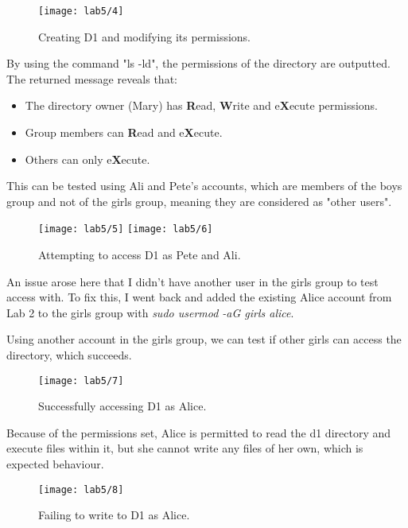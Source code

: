 \begin{figure}[H]
    \centering
    \texttt{[image: lab5/4]}
    \caption{Creating D1 and modifying its permissions.}
    \label{fig:D1}
\end{figure}

\noindent By using the command "ls -ld", the permissions of the directory are outputted.
The returned message reveals that:
\begin{itemize}
    \item The directory owner (Mary) has \textbf{R}ead, \textbf{W}rite and e\textbf{X}ecute permissions.
    \item Group members can \textbf{R}ead and e\textbf{X}ecute.
    \item Others can only e\textbf{X}ecute.
\end{itemize}

This can be tested using Ali and Pete's accounts, which are members of the boys group and not of the
girls group, meaning they are considered as "other users".

\begin{figure}[H]
    \centering
    \texttt{[image: lab5/5]}
    \texttt{[image: lab5/6]}
    \caption{Attempting to access D1 as Pete and Ali.}
    \label{fig:boysD1}
\end{figure}

\begin{tcolorbox}[colback=orange!5!white,colframe=orange!75!black,title=Note]
    An issue arose here that I didn't have another user in the girls group to test access with.
    To fix this, I went back and added the existing Alice account from Lab 2 to the girls group
    with \textit{sudo usermod -aG girls alice}.
\end{tcolorbox}

Using another account in the girls group, we can test if other girls can access the directory,
which succeeds.

\begin{figure}[H]
    \centering
    \texttt{[image: lab5/7]}
    \caption{Successfully accessing D1 as Alice.}
    \label{fig:girlsD1}
\end{figure}

Because of the permissions set, Alice is permitted to read the d1 directory and execute files
within it, but she cannot write any files of her own, which is expected behaviour.

\begin{figure}[H]
    \centering
    \texttt{[image: lab5/8]}
    \caption{Failing to write to D1 as Alice.}
    \label{fig:girlsWriteD1Fail}
\end{figure}

